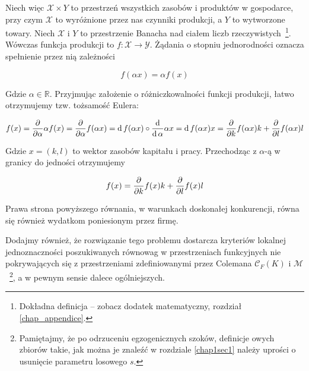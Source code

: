 Niech więc $ \mathcal{X} \times Y $ to przestrzeń wszystkich zasobów i produktów w gospodarce, przy czym $ \mathcal{X} $ to wyróżnione przez nas czynniki produkcji, a $ Y $ to wytworzone towary. Niech $ \mathcal{X} $ i $ Y $ to przestrzenie Banacha nad ciałem liczb rzeczywistych~\footnote{Dokładna definicja -- zobacz dodatek matematyczny, rozdział \ref{chap_appendice}.}. Wówczas funkcja produkcji to $ f: \mathcal{X} \rightarrow \mathcal{Y} $. Żądania o stopniu jednorodności oznacza spełnienie przez nią zależności

$$ f(\alpha x) = \alpha f(x) $$

Gdzie $ \alpha \in \mathbb{R}$. Przyjmując założenie o różniczkowalności funkcji produkcji, łatwo otrzymujemy tzw. tożsamość Eulera:

$$f(x) =  \frac{\partial}{\partial \alpha} \alpha {f( x)} = \frac{\partial}{\partial \alpha} f( \alpha x) =  \mathrm{d}\,f( \alpha x) \circ \frac{\mathrm{d}}{\mathrm{d}\,\alpha}  \alpha x = \mathrm{d}\,f( \alpha x) x = \frac{\partial}{\partial k}  f(\alpha x) k +  \frac{\partial}{\partial l}  f(\alpha x)l$$

Gdzie $ x = (k,l) $ to wektor zasobów kapitału i pracy. Przechodząc z $ \alpha $-ą w granicy do jedności otrzymujemy 

$$ f(x) = \frac{\partial}{\partial k}  f(x) k +  \frac{\partial}{\partial l}  f(x)l$$

Prawa strona powyższego równania, w warunkach doskonałej konkurencji, równa się również wydatkom poniesionym przez firmę. 

Dodajmy również, że rozwiązanie tego problemu dostarcza kryteriów lokalnej jednoznaczności poszukiwanych równowag w przestrzeniach funkcyjnych nie pokrywających się z przestrzeniami zdefiniowanymi przez Colemana $\mathcal{C}_F (K)$ i $\mathcal{M}$~\footnote{Pamiętajmy, że po odrzuceniu egzogenicznych szoków, definicje owych zbiorów takie, jak można je znaleźć w rozdziale \ref{chap1sec1} należy uprości o usunięcie parametru losowego $s$.}, a w pewnym sensie dalece ogólniejszych.